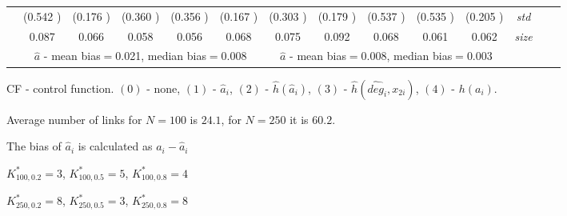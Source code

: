\begin{table}
\begin{threeparttable}
{\begin{tabular}{|c|c|c|c|c|c|c|c|c|c|c|c|c|c|}
&(0.542 )&(0.176 )&(0.360 )&(0.356 )&(0.167 )&(0.303 )&(0.179 )&(0.537 )&(0.535 )&(0.205 )&\textit{std}\\ 
& 0.087 & 0.066 &0.058 &0.056 &0.068 &0.075& 0.092& 0.068 &0.061 &0.062 &\textit{size} \\\midrule 
&\multicolumn{5}{|c|}{$\hat{a}$ - mean bias$=$0.021, median bias$=$0.008 }&\multicolumn{5}{|c|}{$\hat{a}$ - mean bias$=$0.008, median bias$=$0.003 }&\\ \hline 
\end{tabular}} 
\begin{tablenotes}\tiny 
\item CF - control function. $(0)$ - none, $(1)$ - $\hat{a}_i$,  $(2)$ - $\hat{h}(\hat{a}_i)$, $(3)$ - $\hat{h}(\widehat{deg}_i,x_{2i})$, $(4)$ - $h(a_i)$. 
\item Average number of links for $N=100$ is $24.1$, for $N=250$ it is $60.2$. 
\item The bias of $\hat{a}_i$ is calculated as $a_i-\hat{a}_i$ 
\item $K^*_{100,0.2}=3$, $K^*_{100,0.5}=5$, $K^*_{100,0.8}=4$ 
\item $K^*_{250,0.2}=8$, $K^*_{250,0.5}=3$, $K^*_{250,0.8}=8$ 
  \end{tablenotes} 
\end{threeparttable} 
\end{table} 
